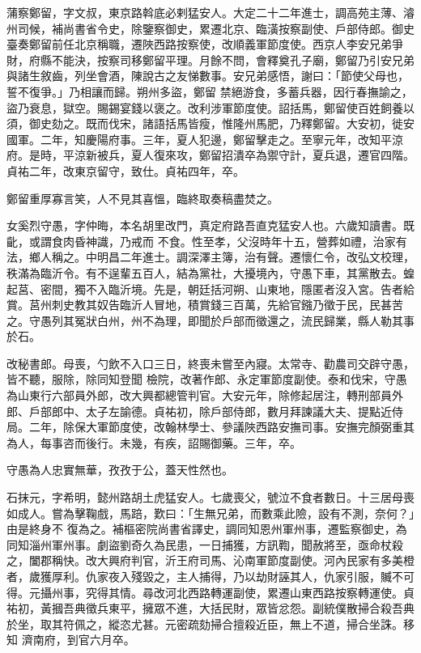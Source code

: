\begin{pinyinscope}
 蒲察鄭留，字文叔，東京路斡底必剌猛安人。大定二十二年進士，調高苑主薄、濬州司候，補尚書省令史，除鑒察御史，累遷北京、臨潢按察副使、戶部侍郎。御史臺奏鄭留前任北京稱職，遷陜西路按察使，改順義軍節度使。西京人李安兄弟爭財，府縣不能決，按察司移鄭留平理。月餘不問，會釋奠孔子廟，鄭留乃引安兄弟與諸生敘齒，列坐會酒，陳說古之友悌數事。安兄弟感悟，謝曰：「節使父母也，誓不復爭。」乃相讓而歸。朔州多盜，鄭留
 禁絕游食，多蓄兵器，因行春撫諭之，盜乃衰息，獄空。賜錫宴錢以褒之。改利涉軍節度使。詔括馬，鄭留使百姓飼養以須，御史劾之。既而伐宋，諸語括馬皆瘦，惟隆州馬肥，乃釋鄭留。大安初，徙安國軍。二年，知慶陽府事。三年，夏人犯邊，鄭留擊走之。至寧元年，改知平涼府。是時，平涼新被兵，夏人復來攻，鄭留招潰卒為禦守計，夏兵退，遷官四階。貞祐二年，改東京留守，致仕。貞祐四年，卒。



 鄭留重厚寡言笑，人不見其喜慍，臨終取奏稿盡焚之。



 女奚烈守愚，字仲晦，本名胡里改門，真定府路吾直克猛安人也。六歲知讀書。既齔，或謂食肉昏神識，乃戒而
 不食。性至孝，父沒時年十五，營葬如禮，治家有法，鄉人稱之。中明昌二年進士。調深澤主簿，治有聲。遷懷仁令，改弘文校理，秩滿為臨沂令。有不逞輩五百人，結為黨社，大擾境內，守愚下車，其黨散去。蝗起莒、密間，獨不入臨沂境。先是，朝廷括河朔、山東地，隱匿者沒入宮。告者給賞。莒州刺史教其奴告臨沂人冒地，積賞錢三百萬，先給官鏹乃徵于民，民甚苦之。守愚列其冤狀白州，州不為理，即聞於戶部而徵還之，流民歸業，縣人勒其事於石。



 改秘書郎。母喪，勺飲不入口三日，終喪未嘗至內寢。太常寺、勸農司交辟守愚，皆不聽，服除，除同知登聞
 檢院，改著作郎、永定軍節度副使。泰和伐宋，守愚為山東行六部員外郎，改大興都總管判官。大安元年，除修起居注，轉刑部員外郎、戶部郎中、太子左諭德。貞祐初，除戶部侍郎，數月拜諫議大夫、提點近侍局。二年，除保大軍節度使，改翰林學士、參議陜西路安撫司事。安撫完顏弼重其為人，每事咨而後行。未幾，有疾，詔賜御藥。三年，卒。



 守愚為人忠實無華，孜孜于公，蓋天性然也。



 石抹元，字希明，懿州路胡土虎猛安人。七歲喪父，號泣不食者數日。十三居母喪如成人。嘗為擊鞠戲，馬踣，歎曰：「生無兄弟，而數乘此險，設有不測，奈何？」由是終身不
 復為之。補樞密院尚書省譯史，調同知恩州軍州事，遷監察御史，為同知淄州軍州事。劇盜劉奇久為民患，一日捕獲，方訊鞫，聞赦將至，亟命杖殺之，闔郡稱快。改大興府判官，沂王府司馬、沁南軍節度副使。河內民家有多美橙者，歲獲厚利。仇家夜入殘毀之，主人捕得，乃以劫財誣其人，仇家引服，贓不可得。元攝州事，究得其情。尋改河北西路轉運副使，累遷山東西路按察轉運使。貞祐初，黃摑吾典徵兵東平，擁眾不進，大括民財，眾皆忿怨。副統僕散掃合殺吾典於坐，取其符佩之，縱恣尤甚。元密疏劾掃合擅殺近臣，無上不道，掃合坐誅。移知
 濟南府，到官六月卒。




\end{pinyinscope}
